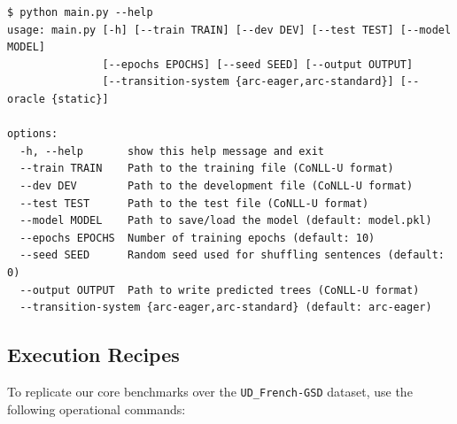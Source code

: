 \documentclass[12pt,a4paper]{article}
\begin{document}
\begin{footnotesize}
\begin{verbatim}
$ python main.py --help
usage: main.py [-h] [--train TRAIN] [--dev DEV] [--test TEST] [--model MODEL]
               [--epochs EPOCHS] [--seed SEED] [--output OUTPUT]
               [--transition-system {arc-eager,arc-standard}] [--oracle {static}]

options:
  -h, --help       show this help message and exit
  --train TRAIN    Path to the training file (CoNLL-U format)
  --dev DEV        Path to the development file (CoNLL-U format)
  --test TEST      Path to the test file (CoNLL-U format)
  --model MODEL    Path to save/load the model (default: model.pkl)
  --epochs EPOCHS  Number of training epochs (default: 10)
  --seed SEED      Random seed used for shuffling sentences (default: 0)
  --output OUTPUT  Path to write predicted trees (CoNLL-U format)
  --transition-system {arc-eager,arc-standard} (default: arc-eager)
\end{verbatim}
\end{footnotesize}

\subsection{Execution Recipes}
To replicate our core benchmarks over the \texttt{UD\_French-GSD} dataset, use the following operational commands:
\end{document}
